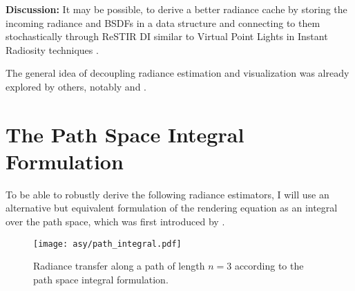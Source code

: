 \textbf{Discussion:} It may be possible, to derive a better radiance cache by storing the incoming radiance and BSDFs in a data structure and connecting to them stochastically through ReSTIR DI  similar to Virtual Point Lights in Instant Radiosity techniques .

The general idea of decoupling radiance estimation and visualization was already explored by others, notably \textcite{walter1999} and \textcite{tole2002}.

\section{The Path Space Integral Formulation}
\label{sec:path_space_integral}
To be able to robustly derive the following radiance estimators, I will use an alternative but equivalent formulation of the rendering equation as an integral over the path space, which was first introduced by \textcite{veach1997}.
\begin{figure}[ht]
    \centering
    \texttt{[image: asy/path\_integral.pdf]}
\caption{Radiance transfer along a path of length $n=3$ according to the path space integral formulation.}
\label{fig:path_space_integral}
\end{figure}

